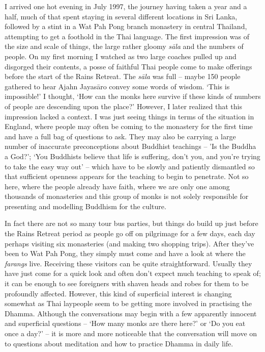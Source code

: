 I arrived one hot evening in July 1997, the journey having taken a year
and a half, much of that spent staying in several different locations in
Sri Lanka, followed by a stint in a Wat Pah Pong branch monastery in
central Thailand, attempting to get a foothold in the Thai language. The
first impression was of the size and scale of things, the large rather
gloomy \emph{sāla} and the numbers of people. On my first morning I
watched as two large coaches pulled up and disgorged their contents, a
posse of faithful Thai people come to make offerings before the start of
the Rains Retreat. The \emph{sāla} was full -- maybe 150 people
gathered to hear Ajahn Jayasāro convey some words of wisdom. `This is
impossible!' I thought, `How can the monks here survive if these kinds
of numbers of people are descending upon the place?' However, I later
realized that this impression lacked a context. I was just seeing things
in terms of the situation in England, where people may often be coming
to the monastery for the first time and have a full bag of questions to
ask. They may also be carrying a large number of inaccurate
preconceptions about Buddhist teachings -- 'Is the Buddha a God?'; `You
Buddhists believe that life is suffering, don't you, and you're trying
to take the easy way out' -- which have to be slowly and patiently
dismantled so that sufficient openness appears for the teaching to begin
to penetrate. Not so here, where the people already have faith, where we
are only one among thousands of monasteries and this group of monks is
not solely responsible for presenting and modelling Buddhism for the
culture. 

In fact there are not so many tour bus parties, but things do build up
just before the Rains Retreat period as people go off on pilgrimage for
a few days, each day perhaps visiting six monasteries (and making two
shopping trips). After they've been to Wat Pah Pong, they simply must
come and have a look at where the \emph{farangs} live. Receiving these
visitors can be quite straightforward. Usually they have just come for a
quick look and often don't expect much teaching to speak of; it can be
enough to see foreigners with shaven heads and robes for them to be
profoundly affected. However, this kind of superficial interest is
changing somewhat as Thai laypeople seem to be getting more involved in
practising the Dhamma. Although the conversations may begin with a few
apparently innocent and superficial questions -- `How many monks are
there here?' or `Do you eat once a day?' -- it is more and more
noticeable that the conversation will move on to questions about
meditation and how to practice Dhamma in daily life. 

